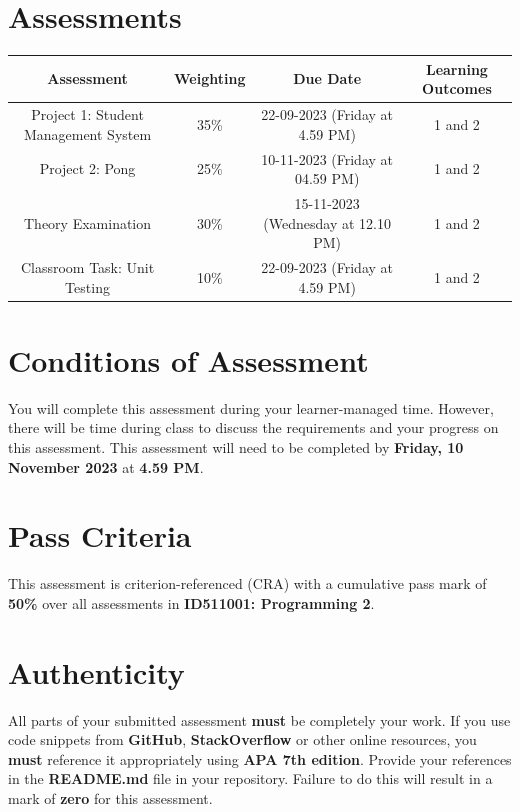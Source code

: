 \documentclass{article}
\begin{document}
\section*{Assessments}
\renewcommand{\arraystretch}{1.5}
\begin{tabular}{|c|c|c|c|}
	\hline
	\textbf{Assessment}                                 & \textbf{Weighting} & \textbf{Due Date}            & \textbf{Learning Outcomes} \\ \hline
	\small Project 1: Student Management System  & \small 35\%        & \small 22-09-2023 (Friday at 4.59 PM)   & \small 1 and 2                   \\ \hline
	\small Project 2: Pong & \small 25\%        & \small 10-11-2023 (Friday at 04.59 PM)  & \small 1 and 2                   \\ \hline
	\small Theory Examination                        & \small 30\%        & \small 15-11-2023 (Wednesday at 12.10 PM)  & \small 1 and 2                   \\ \hline
	\small Classroom Task: Unit Testing                       & \small 10\%        & \small 22-09-2023 (Friday at 4.59 PM)  & \small 1 and 2                   \\ \hline
\end{tabular} 

\section*{Conditions of Assessment}
You will complete this assessment during your learner-managed time. However, there will be time during class to discuss the requirements and your progress on this assessment. This assessment will need to be completed by \textbf{Friday, 10 November 2023} at \textbf{4.59 PM}.

\section*{Pass Criteria}
This assessment is criterion-referenced (CRA) with a cumulative pass mark of \textbf{50\%} over all assessments in \textbf{ID511001: Programming 2}.

\section*{Authenticity}
All parts of your submitted assessment \textbf{must} be completely your work. If you use code snippets from \textbf{GitHub}, \textbf{StackOverflow} or other online resources, you \textbf{must} reference it appropriately using \textbf{APA 7th edition}. Provide your references in the \textbf{README.md} file in your repository. Failure to do this will result in a mark of \textbf{zero} for this assessment.
\end{document}
